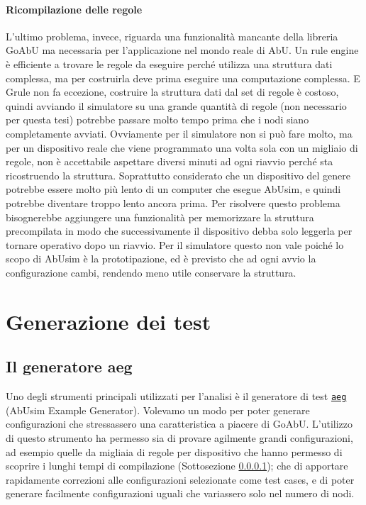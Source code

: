\documentclass[12pt, a4paper]{article}
\newcommand{\aeg}[0]{{\lstinline{aeg}}\xspace}
\begin{document}
\paragraph{Ricompilazione delle regole}\label{ricompilazione}

L'ultimo problema, invece, riguarda una funzionalità mancante della libreria GoAbU ma necessaria per l'applicazione nel mondo reale di AbU.
Un rule engine è efficiente a trovare le regole da eseguire perché utilizza una struttura dati complessa, ma per costruirla deve prima eseguire una computazione complessa. E Grule non fa eccezione, costruire la struttura dati dal set di regole è costoso, quindi avviando il simulatore su una grande quantità di regole (non necessario per questa tesi) potrebbe passare molto tempo prima che i nodi siano completamente avviati.
Ovviamente per il simulatore non si può fare molto, ma per un dispositivo reale che viene programmato una volta sola con un migliaio di regole, non è accettabile aspettare diversi minuti ad ogni riavvio perché sta ricostruendo la struttura. Soprattutto considerato che un dispositivo del genere potrebbe essere molto più lento di un computer che esegue AbUsim, e quindi potrebbe diventare troppo lento ancora prima.
Per risolvere questo problema bisognerebbe aggiungere una funzionalità per memorizzare la struttura precompilata in modo che successivamente il dispositivo debba solo leggerla per tornare operativo dopo un riavvio. Per il simulatore questo non vale poiché lo scopo di AbUsim è la prototipazione, ed è previsto che ad ogni avvio la configurazione cambi, rendendo meno utile conservare la struttura.

\newpage

\section{Generazione dei test}\label{aeg}

\subsection{Il generatore aeg}\label{aeg:descrizione}

Uno degli strumenti principali utilizzati per l'analisi è il generatore di test \href{https://github.com/KayJay7/abusim-example-generator}{\aeg} (AbUsim Example Generator). Volevamo un modo per poter generare configurazioni che stressassero una caratteristica a piacere di GoAbU. L'utilizzo di questo strumento ha permesso sia di provare agilmente grandi configurazioni, ad esempio quelle da migliaia di regole per dispositivo che hanno permesso di scoprire i lunghi tempi di compilazione (Sottosezione \ref{ricompilazione}); che di apportare rapidamente correzioni alle configurazioni selezionate come test cases, e di poter generare facilmente configurazioni uguali che variassero solo nel numero di nodi.
\end{document}
